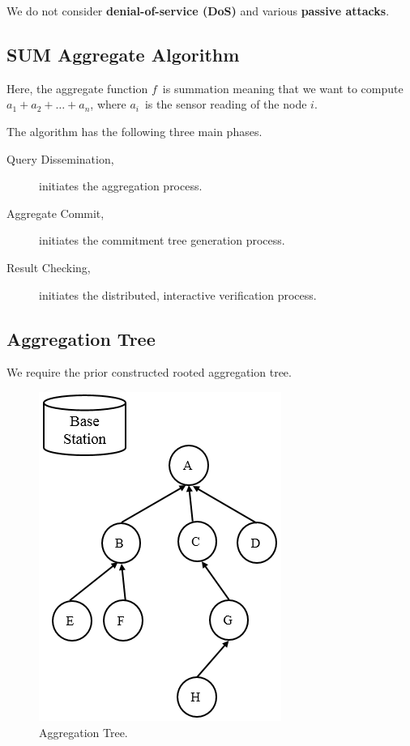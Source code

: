 \documentclass[%
  slidesonly,%
  semlayer%
  ]{seminar}                                  %
\begin{document}
\begin{slide}
      We do not consider \textbf{denial-of-service (DoS)} and various \textbf{passive attacks}.
      \vfill
      \clearpage

    \subsection*{SUM Aggregate Algorithm}
      \vfill
      Here, the aggregate function $f$\ is summation meaning that we want to compute $a_{1} + a_{2} + \dotsc + a_{n}$, where $a_{i}$\ is the sensor reading of the node $i$.
 
      The algorithm has the following three main phases.
      \begin{description}
        \item [Query Dissemination,] initiates the aggregation process.
        \item [Aggregate Commit,] initiates the commitment tree generation process.
        \item [Result Checking,] initiates the distributed, interactive verification process.
      \end{description}
      \vfill
      \clearpage

    \subsection*{Aggregation Tree}
      \vfill
      We require the prior constructed rooted aggregation tree.
      \begin{figure}[h!]
        \centering
        \includegraphics[scale=0.4]{images/aggregation-tree-1.png}
        \caption{Aggregation Tree.}
        \label{fig:Aggregation-tree-1}
      \end{figure}
      \vfill
      \clearpage


\end{slide}
\end{document}

